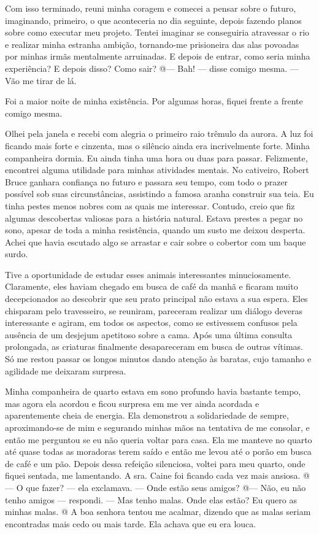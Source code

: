 Com isso terminado, reuni minha coragem e comecei a pensar sobre o
futuro, imaginando, primeiro, o que aconteceria no dia seguinte, depois
fazendo planos sobre como executar meu projeto. Tentei imaginar se
conseguiria atravessar o rio e realizar minha estranha ambição,
tornando-me prisioneira das alas povoadas por minhas irmãs mentalmente
arruinadas. E depois de entrar, como seria minha experiência? E depois
disso? Como sair? @--- Bah! --- disse comigo mesma. --- Vão me tirar de
lá.

Foi a maior noite de minha existência. Por algumas horas, fiquei frente
a frente comigo mesma.

Olhei pela janela e recebi com alegria o primeiro raio trêmulo da
aurora. A luz foi ficando mais forte e cinzenta, mas o silêncio ainda
era incrivelmente forte. Minha companheira dormia. Eu ainda tinha uma
hora ou duas para passar. Felizmente, encontrei alguma utilidade para
minhas atividades mentais. No cativeiro, Robert Bruce ganhara confiança
no futuro e passara seu tempo, com todo o prazer possível sob suas
circunstâncias, assistindo a famosa aranha construir sua teia. Eu tinha
pestes menos nobres com as quais me interessar. Contudo, creio que fiz
algumas descobertas valiosas para a história natural. Estava prestes a
pegar no sono, apesar de toda a minha resistência, quando um susto me
deixou desperta. Achei que havia escutado algo se arrastar e cair sobre
o cobertor com um baque surdo.

Tive a oportunidade de estudar esses animais interessantes
minuciosamente. Claramente, eles haviam chegado em busca de café da
manhã e ficaram muito decepcionados ao descobrir que seu prato principal
não estava a sua espera. Eles chisparam pelo travesseiro, se reuniram,
pareceram realizar um diálogo deveras interessante e agiram, em todos os
aspectos, como se estivessem confusos pela ausência de um desjejum
apetitoso sobre a cama. Após uma última consulta prolongada, as
criaturas finalmente desapareceram em busca de outras vítimas. Só me
restou passar os longos minutos dando atenção às baratas, cujo tamanho e
agilidade me deixaram surpresa.

Minha companheira de quarto estava em sono profundo havia bastante
tempo, mas agora ela acordou e ficou surpresa em me ver ainda acordada e
aparentemente cheia de energia. Ela demonstrou a solidariedade de
sempre, aproximando-se de mim e segurando minhas mãos na tentativa de me
consolar, e então me perguntou se eu não queria voltar para casa. Ela me
manteve no quarto até quase todas as moradoras terem saído e então me
levou até o porão em busca de café e um pão. Depois dessa refeição
silenciosa, voltei para meu quarto, onde fiquei sentada, me lamentando.
A sra. Caine foi ficando cada vez mais ansiosa. @--- O que fazer? ---
ela exclamava. --- Onde estão seus amigos? @--- Não, eu não tenho amigos
--- respondi. --- Mas tenho malas. Onde elas estão? Eu quero as minhas
malas. @ A boa senhora tentou me acalmar, dizendo que as malas seriam
encontradas mais cedo ou mais tarde. Ela achava que eu era louca.

